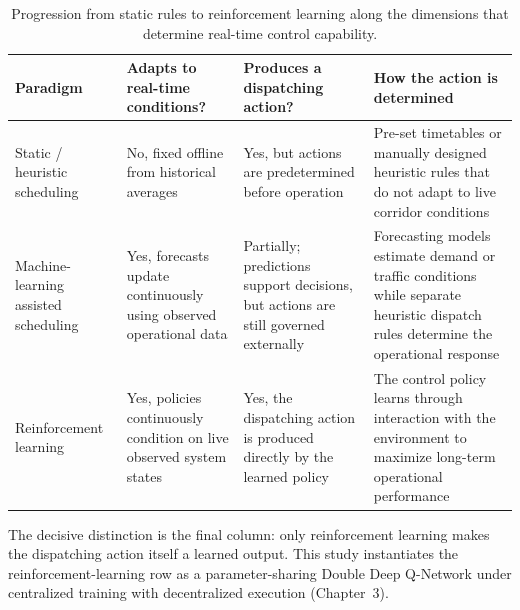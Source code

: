 \begin{table}[htbp]
\centering
\caption{Progression from static rules to reinforcement learning along the dimensions that determine real-time control capability.}
\label{tab:control_paradigms}

\footnotesize
\renewcommand{\arraystretch}{1.3}

\begin{tabularx}{\textwidth}{
>{\RaggedRight\arraybackslash}p{2.8cm}
>{\RaggedRight\arraybackslash}p{3.5cm}
>{\RaggedRight\arraybackslash}p{3.5cm}
>{\RaggedRight\arraybackslash}X
}
\toprule
\textbf{Paradigm} & 
\textbf{Adapts to real-time conditions?} & 
\textbf{Produces a dispatching action?} & 
\textbf{How the action is determined} \\
\midrule

Static / heuristic scheduling & 
No, fixed offline from historical averages & 
Yes, but actions are predetermined before operation & 
Pre-set timetables or manually designed heuristic rules that do not adapt to live corridor conditions \cite{Ceder2007,Daganzo2009} \\

Machine-learning assisted scheduling & 
Yes, forecasts update continuously using observed operational data & 
Partially; predictions support decisions, but actions are still governed externally & 
Forecasting models estimate demand or traffic conditions while separate heuristic dispatch rules determine the operational response \cite{Barrera2025Optimization,Usman2025ML,pang2019} \\

Reinforcement learning & 
Yes, policies continuously condition on live observed system states & 
Yes, the dispatching action is produced directly by the learned policy & 
The control policy learns through interaction with the environment to maximize long-term operational performance \cite{Momenikorbekandi2023Intelligent,Rodriguez2023Cooperative,Wangsun} \\

\bottomrule
\end{tabularx}
\end{table}

The decisive distinction is the final column: only reinforcement learning makes the dispatching action itself a learned output. This study instantiates the reinforcement-learning row as a parameter-sharing Double Deep Q-Network under centralized training with decentralized execution (Chapter~3).
\FloatBarrier
